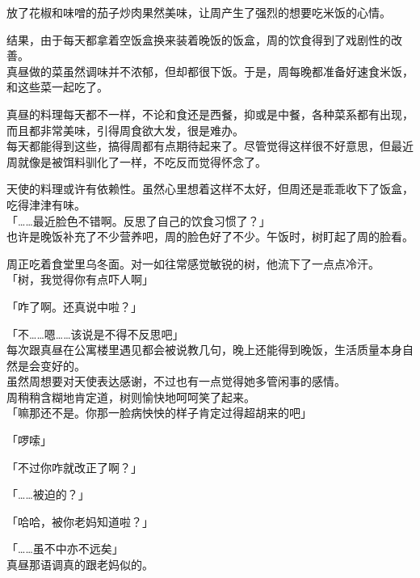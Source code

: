 放了花椒和味噌的茄子炒肉果然美味，让周产生了强烈的想要吃米饭的心情。\\

\vspace{2\baselineskip}

结果，由于每天都拿着空饭盒换来装着晚饭的饭盒，周的饮食得到了戏剧性的改善。\\

真昼做的菜虽然调味并不浓郁，但却都很下饭。于是，周每晚都准备好速食米饭，和这些菜一起吃了。

真昼的料理每天都不一样，不论和食还是西餐，抑或是中餐，各种菜系都有出现，而且都非常美味，引得周食欲大发，很是难办。\\

每天都能得到这些，搞得周都有点期待起来了。尽管觉得这样很不好意思，但最近周就像是被饵料驯化了一样，不吃反而觉得怀念了。

天使的料理或许有依赖性。虽然心里想着这样不太好，但周还是乖乖收下了饭盒，吃得津津有味。\\

「……最近脸色不错啊。反思了自己的饮食习惯了？」\\

也许是晚饭补充了不少营养吧，周的脸色好了不少。午饭时，树盯起了周的脸看。

周正吃着食堂里乌冬面。对一如往常感觉敏锐的树，他流下了一点点冷汗。\\

「树，我觉得你有点吓人啊」

「咋了啊。还真说中啦？」

「不……嗯……该说是不得不反思吧」\\

每次跟真昼在公寓楼里遇见都会被说教几句，晚上还能得到晚饭，生活质量本身自然是会变好的。\\

虽然周想要对天使表达感谢，不过也有一点觉得她多管闲事的感情。\\

周稍稍含糊地肯定道，树则愉快地呵呵笑了起来。\\

「嘛那还不是。你那一脸病怏怏的样子肯定过得超胡来的吧」

「啰嗦」

「不过你咋就改正了啊？」

「……被迫的？」

「哈哈，被你老妈知道啦？」

「……虽不中亦不远矣」\\

真昼那语调真的跟老妈似的。

